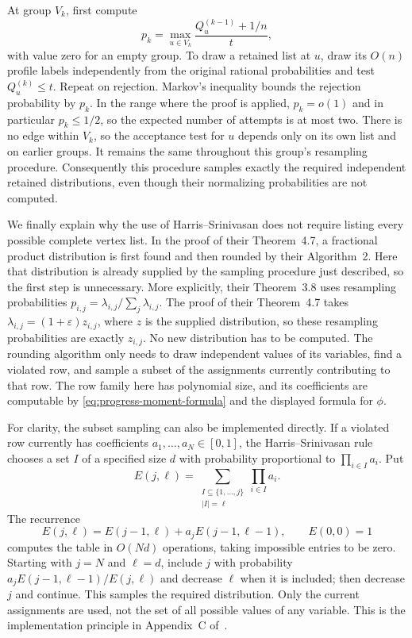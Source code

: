 \documentclass[11pt]{article}
\theoremstyle{definition}\newtheorem{algorithm}{Algorithm}[section]
\numberwithin{equation}{section}
\theoremstyle{remark}\newtheorem*{remark}{Remark}
\begin{document}
At group $V_k$, first compute
\[
 p_k=\max_{u\in V_k}\frac{Q_u^{(k-1)}+1/n}{t},
\]
with value zero for an empty group. To draw a retained list at $u$, draw
its $O(n)$ profile labels independently from the original rational
probabilities and test $Q_u^{(k)}\le t$. Repeat on rejection. Markov's
inequality bounds the rejection probability by $p_k$. In the range where
the proof is applied, $p_k=o(1)$ and in particular $p_k\le1/2$, so the
expected number of attempts is at most two. There is no edge within
$V_k$, so the acceptance test for $u$ depends only on its own list and
on earlier groups. It remains the same throughout this group's
resampling procedure. Consequently this procedure samples exactly the
required independent retained distributions, even though their
normalizing probabilities are not computed.

We finally explain why the use of Harris--Srinivasan does not require
listing every possible complete vertex list. In the proof of their
Theorem~4.7, a fractional product distribution is first found and then
rounded by their Algorithm~2. Here that distribution is already supplied
by the sampling procedure just described, so the first step is
unnecessary. More explicitly, their Theorem~3.8 uses resampling
probabilities $p_{i,j}=\lambda_{i,j}/\sum_j\lambda_{i,j}$. The proof
of their Theorem~4.7 takes $\lambda_{i,j}=(1+\varepsilon)z_{i,j}$,
where $z$ is the supplied distribution, so these resampling
probabilities are exactly $z_{i,j}$. No new distribution has to be
computed. The rounding algorithm only needs to draw independent
values of its variables, find a violated row, and sample a subset of the
assignments currently contributing to that row. The row family here has
polynomial size, and its coefficients are computable by
\eqref{eq:progress-moment-formula} and the displayed formula for $\phi$.

For clarity, the subset sampling can also be implemented directly. If a
violated row currently has coefficients $a_1,\ldots,a_N\in[0,1]$, the
Harris--Srinivasan rule chooses a set $I$ of a specified size $d$ with
probability proportional to $\prod_{i\in I}a_i$. Put
\[
 E(j,\ell)=\sum_{\substack{I\subseteq\{1,\ldots,j\}\\|I|=\ell}}
                  \prod_{i\in I}a_i.
\]
The recurrence
\[
 E(j,\ell)=E(j-1,\ell)+a_jE(j-1,\ell-1),\qquad E(0,0)=1
\]
computes the table in $O(Nd)$ operations, taking impossible entries to
be zero. Starting with $j=N$ and $\ell=d$, include $j$ with probability
$a_jE(j-1,\ell-1)/E(j,\ell)$ and decrease $\ell$ when it is included;
then decrease $j$ and continue. This samples the required distribution.
Only the current assignments are used, not the set of all possible
values of any variable. This is the implementation principle in
Appendix~C of~\cite{HS}.
\end{document}
